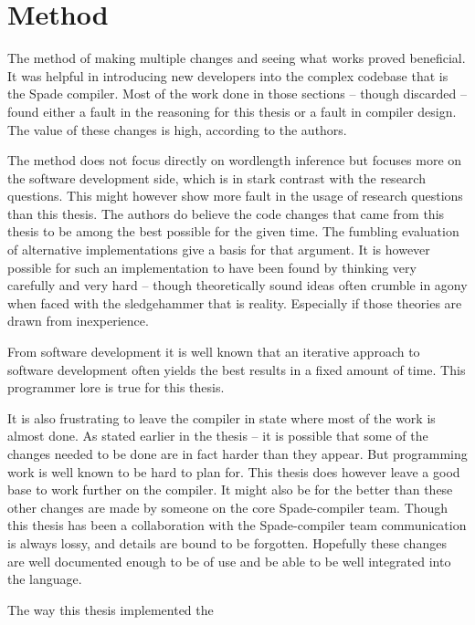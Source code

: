 \section{Method}
The method of making multiple changes and seeing what works proved beneficial. It was helpful in introducing new developers into the complex codebase that is the Spade compiler. Most of the work done in those sections -- though discarded -- found either a fault in the reasoning for this thesis or a fault in compiler design. The value of these changes is high, according to the authors.

The method does not focus directly on wordlength inference but focuses more on the software development side, which is in stark contrast with the research questions. This might however show more fault in the usage of research questions than this thesis. The authors do believe the code changes that came from this thesis to be among the best possible for the given time. The fumbling evaluation of alternative implementations give a basis for that argument. It is however possible for such an implementation to have been found by thinking very carefully and very hard -- though theoretically sound ideas often crumble in agony when faced with the sledgehammer that is reality. Especially if those theories are drawn from inexperience.

From software development it is well known that an iterative approach to software development often yields the best results in a fixed amount of time. This programmer lore is true for this thesis.

It is also frustrating to leave the compiler in state where most of the work is almost done. As stated earlier in the thesis -- it is possible that some of the changes needed to be done are in fact harder than they appear. But programming work is well known to be hard to plan for. This thesis does however leave a good base to work further on the compiler. It might also be for the better than these other changes are made by someone on the core Spade-compiler team. Though this thesis has been a collaboration with the Spade-compiler team communication is always lossy, and details are bound to be forgotten. Hopefully these changes are well documented enough to be of use and be able to be well integrated into the language.

The way this thesis implemented the 

